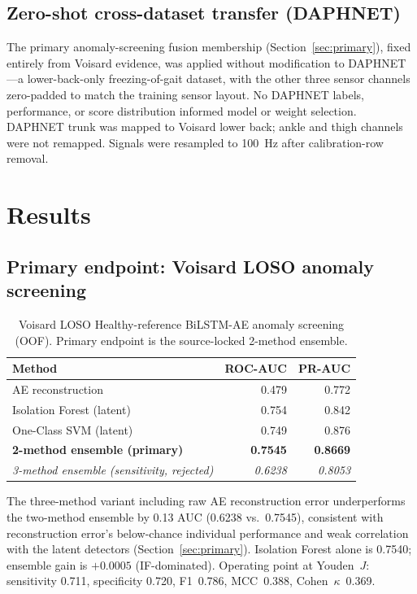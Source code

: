 \subsection{Zero-shot cross-dataset transfer (DAPHNET)}
\label{sec:daphnet}

The primary anomaly-screening fusion membership (Section~\ref{sec:primary}), fixed entirely from Voisard evidence, was applied without modification to DAPHNET---a lower-back-only freezing-of-gait dataset, with the other three sensor channels zero-padded to match the training sensor layout. No DAPHNET labels, performance, or score distribution informed model or weight selection. DAPHNET trunk was mapped to Voisard lower back; ankle and thigh channels were not remapped. Signals were resampled to 100~Hz after calibration-row removal.

\section{Results}

\subsection{Primary endpoint: Voisard LOSO anomaly screening}

\begin{table}[ht]
\centering
\caption{Voisard LOSO Healthy-reference BiLSTM-AE anomaly screening (OOF). Primary endpoint is the source-locked 2-method ensemble.}
\label{tab:voisard-ae}
\begin{tabular}{lrr}
\toprule
Method & ROC-AUC & PR-AUC \\
\midrule
AE reconstruction & 0.479 & 0.772 \\
Isolation Forest (latent) & 0.754 & 0.842 \\
One-Class SVM (latent) & 0.749 & 0.876 \\
\textbf{2-method ensemble (primary)} & \textbf{0.7545} & \textbf{0.8669} \\
\textit{3-method ensemble (sensitivity, rejected)} & \textit{0.6238} & \textit{0.8053} \\
\bottomrule
\end{tabular}
\end{table}

The three-method variant including raw AE reconstruction error underperforms the two-method ensemble by 0.13 AUC (0.6238 vs.\ 0.7545), consistent with reconstruction error's below-chance individual performance and weak correlation with the latent detectors (Section~\ref{sec:primary}). Isolation Forest alone is 0.7540; ensemble gain is $+0.0005$ (IF-dominated). Operating point at Youden~$J$: sensitivity 0.711, specificity 0.720, F1~0.786, MCC~0.388, Cohen~$\kappa$~0.369.

